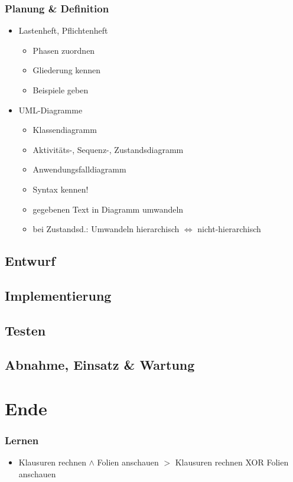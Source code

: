 \documentclass[18pt]{beamer}
\begin{document}
	\begin{frame}
		\frametitle{Planung \& Definition}
		\begin{itemize}
			\item Lastenheft, Pflichtenheft \pause
			\begin{itemize}
				\item Phasen zuordnen \pause
				\item Gliederung kennen \pause
				\item Beispiele geben \pause
			\end{itemize}
			\item UML-Diagramme \pause
			\begin{itemize}
				\item Klassendiagramm \pause
				\item Aktivitäts-, Sequenz-, Zustandsdiagramm \pause 
				\item Anwendungsfalldiagramm \pause
				\item Syntax kennen! \pause
				\item gegebenen Text in Diagramm umwandeln \pause
				\item bei Zustandsd.: Umwandeln hierarchisch $\Leftrightarrow$ nicht-hierarchisch
			\end{itemize}
		\end{itemize}
	\end{frame}


	\subsection{Entwurf}
	
	\subsection{Implementierung}
	
	\subsection{Testen}
	
	\subsection{Abnahme, Einsatz \& Wartung}

\section{Ende}
	\begin{frame}
		\frametitle{Lernen}
		\begin{itemize}
			\item Klausuren rechnen $\land$ Folien anschauen \linebreak $>$ Klausuren rechnen XOR Folien anschauen
		\end{itemize}
	\end{frame}
\end{document}
